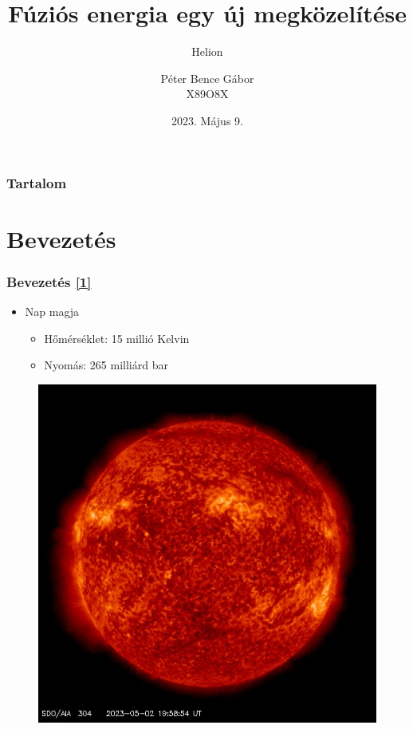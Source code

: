 \documentclass{beamer}
\title{Fúziós energia egy új megközelítése}
\subtitle{Helion}
\author[Péter Bence]{Péter Bence Gábor\\X89O8X}
\institute{Széchenyi István Egyetem}
\date{2023. Május 9.}
\begin{document}
\titlepage


\begin{frame}
    \frametitle{Tartalom}
    \tableofcontents
\end{frame}


\section{Bevezetés}
\begin{frame}
    \frametitle{Bevezetés \hyperlink{1}{\small[1]}}
    \begin{itemize}
        \item Nap magja
        \begin{itemize}
            \item Hőmérséklet: 15 millió Kelvin
            \item Nyomás: 265 milliárd bar
        \end{itemize}
    \end{itemize}
    \begin{figure}
        \includegraphics[scale=0.30]{latest_512_0304.jpg}

\end{figure}
\end{frame}
\end{document}
